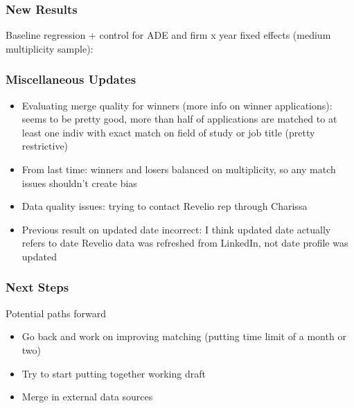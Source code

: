 \documentclass[xcolor=dvipsnames, compress, 12pt, aspectratio=169, handout]{beamer}
\begin{document}
\begin{frame}
    \frametitle{New Results}
    Baseline regression + control for ADE and firm x year fixed effects (medium multiplicity sample):
    \vspace{2mm}
    \small


    \centering
{}

\end{frame}


\begin{frame}
    \frametitle{Miscellaneous Updates}
\begin{itemize}
            \item Evaluating merge quality for winners (more info on winner applications): seems to be pretty good, more than half of applications are matched to at least one indiv with exact match on field of study or job title (pretty restrictive) 
            \item From last time: winners and losers balanced on multiplicity, so any match issues shouldn't create bias
            \item Data quality issues: trying to contact Revelio rep through Charissa
            \item Previous result on updated date incorrect: I think updated date actually refers to date Revelio data was refreshed from LinkedIn, not date profile was updated
\end{itemize}
\end{frame}

\begin{frame}
    \frametitle{Next Steps}
    Potential paths forward 
    \begin{itemize}
        \item Go back and work on improving matching (putting time limit of a month or two)
        \item Try to start putting together working draft
        \item Merge in external data sources 
    \end{itemize}
\end{frame}
\end{document}
